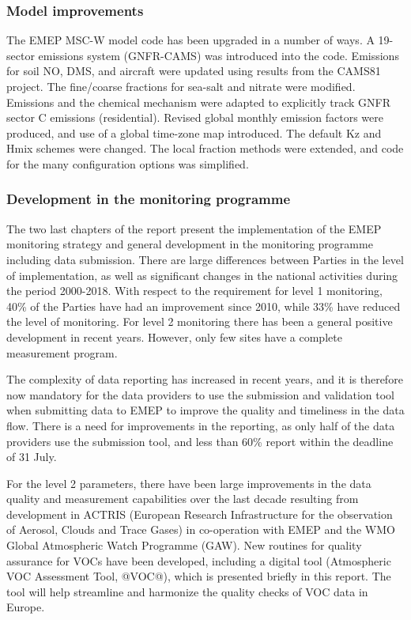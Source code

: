 \subsubsection*{Model improvements} %

The EMEP MSC-W model code has been upgraded in a number of ways. 
A 19-sector emissions system (GNFR-CAMS) was introduced into the code. Emissions for soil NO, DMS, and aircraft were updated using results from the CAMS81 project. 
The  fine/coarse fractions for sea-salt and nitrate were modified. Emissions and the chemical mechanism were adapted to explicitly track GNFR sector C emissions (residential). Revised global monthly emission factors were produced, and use of a global time-zone map introduced. The default Kz and Hmix schemes were changed. The local fraction methods were extended, and code for the many configuration options was simplified. 




\subsubsection*{Development in the monitoring programme} %
The two last chapters of the report present the implementation of the EMEP monitoring strategy and general development in the monitoring programme including data submission. There are large differences between Parties in the level of implementation, as well as significant changes in the national activities during the period 2000-2018. With respect to the requirement for level 1 monitoring, 40\% of the Parties have had an improvement since 2010, while 33\% have reduced the level of monitoring. For level 2 monitoring there has been a general positive development in recent years. However, only few sites have a complete measurement program.

The complexity of data reporting has increased in recent years, and it is therefore now mandatory for the data providers to use the submission and validation tool when submitting data to EMEP to improve the quality and timeliness in the data flow. 
There is a need for improvements in the reporting, as only half of the data 
providers use the submission tool, and less than 60\% report within the deadline of 31 July.

For the level 2 parameters, there have been large improvements in the data quality and measurement capabilities over the last decade resulting from development in ACTRIS (European Research Infrastructure for the observation of Aerosol, Clouds and Trace Gases) in co-operation with EMEP and the WMO Global Atmospheric Watch Programme (GAW). New routines for quality assurance for VOCs have been developed, including a digital tool (Atmospheric VOC Assessment Tool, @VOC@), which is presented briefly in this report. The tool will help streamline and harmonize the quality checks of VOC data in Europe.


